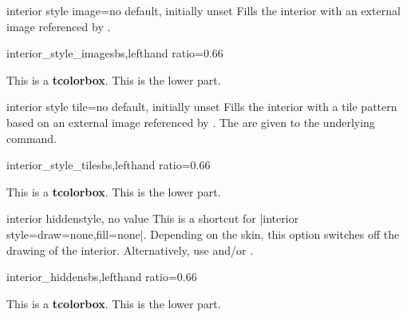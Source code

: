 \clearpage
\begin{docTcbKey}{interior style image}{=}{no default, initially unset}
  Fills the interior with an external image referenced by .
\begin{exdispExample*}{interior_style_image}{sbs,lefthand ratio=0.66}

\begin{tcolorbox}[enhanced,title=My title,
  interior style image=goldshade.png]
This is a \textbf{tcolorbox}.
\tcblower
This is the lower part.
\end{tcolorbox}
\end{exdispExample*}
\end{docTcbKey}


\begin{docTcbKey}{interior style tile}{=}{no default, initially unset}
  Fills the interior with a tile pattern based on an external image referenced by .
  The  are given to the underlying  command.
\begin{exdispExample*}{interior_style_tile}{sbs,lefthand ratio=0.66}

\begin{tcolorbox}[enhanced,title=My title,
  interior style tile={width=2cm}{crinklepaper.png}]
This is a \textbf{tcolorbox}.
\tcblower
This is the lower part.
\end{tcolorbox}
\end{exdispExample*}
\end{docTcbKey}


\begin{docTcbKey}{interior hidden}{}{style, no value}
  This is a shortcut for |interior style={draw=none,fill=none}|.
  Depending on the skin, this option switches off the drawing of the
  interior.
  Alternatively, use  and/or .
\begin{exdispExample*}{interior_hidden}{sbs,lefthand ratio=0.66}

\begin{tcolorbox}[enhanced,title=My title,
  interior hidden]
This is a \textbf{tcolorbox}.
\tcblower
This is the lower part.
\end{tcolorbox}
\end{exdispExample*}
\end{docTcbKey}

